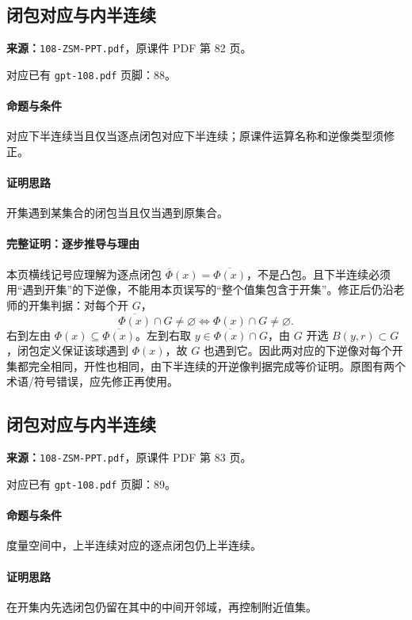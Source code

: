 \clearpage\subsection{闭包对应与内半连续}
\textbf{来源：}\texttt{108-ZSM-PPT.pdf}，原课件 PDF 第 82 页。\par
对应已有 \texttt{gpt-108.pdf} 页脚：88。\par
\paragraph{命题与条件}对应下半连续当且仅当逐点闭包对应下半连续；原课件运算名称和逆像类型须修正。
\paragraph{证明思路}开集遇到某集合的闭包当且仅当遇到原集合。
\paragraph{完整证明：逐步推导与理由}
本页横线记号应理解为逐点闭包 $\overline\Phi(x)=\overline{\Phi(x)}$，不是凸包。且下半连续必须用“遇到开集”的下逆像，不能用本页误写的“整个值集包含于开集”。修正后仍沿老师的开集判据：对每个开 $G$，
\[\overline{\Phi(x)}\cap G\ne\varnothing\iff\Phi(x)\cap G\ne\varnothing.\]
右到左由 $\Phi(x)\subseteq\overline{\Phi(x)}$。左到右取 $y\in\overline{\Phi(x)}\cap G$，由 $G$ 开选 $B(y,r)\subset G$，闭包定义保证该球遇到 $\Phi(x)$，故 $G$ 也遇到它。因此两对应的下逆像对每个开集都完全相同，开性也相同，由下半连续的开逆像判据完成等价证明。原图有两个术语/符号错误，应先修正再使用。
\clearpage\subsection{闭包对应与内半连续}
\textbf{来源：}\texttt{108-ZSM-PPT.pdf}，原课件 PDF 第 83 页。\par
对应已有 \texttt{gpt-108.pdf} 页脚：89。\par
\paragraph{命题与条件}度量空间中，上半连续对应的逐点闭包仍上半连续。
\paragraph{证明思路}在开集内先选闭包仍留在其中的中间开邻域，再控制附近值集。
